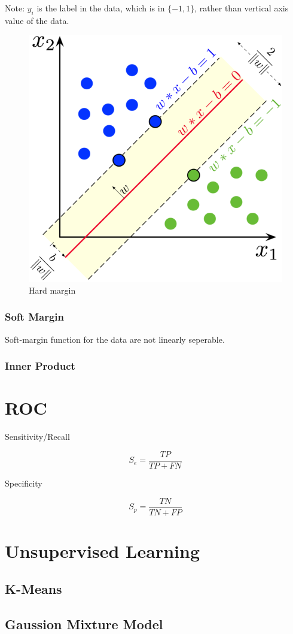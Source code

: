 \documentclass[12pt]{article}
\begin{document}
Note: $y_i$ is the label in the data, which is in $\{-1, 1\}$,
rather than vertical axis value of the data.
\begin{figure}[H]
    \center
    \includegraphics{img/600px-SVM_margin.png}
    \caption{Hard margin}
    \label{fig:svm_hard_margin}
\end{figure}

\subsubsection{Soft Margin}
Soft-margin function for the data are not linearly seperable.

\subsubsection{Inner Product}

\section{ROC}
Sensitivity/Recall

$$
S_{e}=\frac{T P}{T P+F N}
$$

Specificity

$$
S_{p}=\frac{T N}{T N+F P}
$$

\section{Unsupervised Learning}
\subsection{K-Means}

\subsection{Gaussion Mixture Model}
\end{document}
